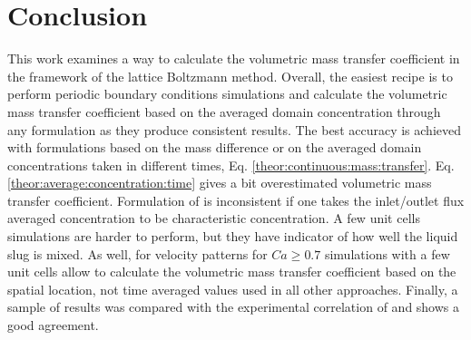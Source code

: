 \documentclass{article}
\begin{document}
\section{Conclusion}
This work examines a way to calculate the volumetric mass transfer coefficient in the framework of
the lattice Boltzmann method. Overall, the easiest recipe is to perform periodic boundary
conditions simulations and calculate the volumetric mass transfer coefficient based on the averaged
domain concentration through any formulation as they produce consistent results. The best accuracy
is achieved with formulations based on the mass difference or on the averaged domain concentrations
taken in different times, Eq. \ref{theor:continuous:mass:transfer}. Eq.
\ref{theor:average:concentration:time} gives a bit overestimated volumetric mass transfer
coefficient. Formulation of
\citet{vanbaten-circular} is inconsistent if one takes the inlet/outlet flux averaged concentration
to be characteristic concentration. A few unit cells simulations are harder to perform, but they
have indicator of how well the liquid slug is mixed. As well, for velocity patterns for $Ca\geq
0.7$ simulations with a few unit cells allow to calculate the volumetric mass transfer
coefficient based on the spatial location, not time averaged values used in all other
approaches. Finally, a sample of results was
compared with the experimental correlation of \citet{yue-mass} and shows a good agreement. 
\appendix
\end{document}
